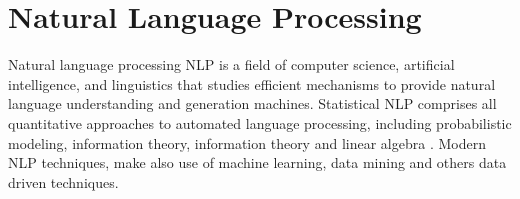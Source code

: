 






     

\section{Natural Language Processing}
\label{sec:rel_nlp}
Natural language processing \ac{NLP} is a field of computer science,
artificial intelligence, and linguistics that studies efficient mechanisms to
provide natural language understanding and generation  machines. 
Statistical \ac{NLP} comprises all quantitative approaches to automated
language processing, including probabilistic modeling, information theory,
information theory and linear algebra \cite{Manning:1999:FSN:311445}.  Modern
\ac{NLP}  techniques,  make also use of  machine learning, data mining  and others data
driven techniques.

